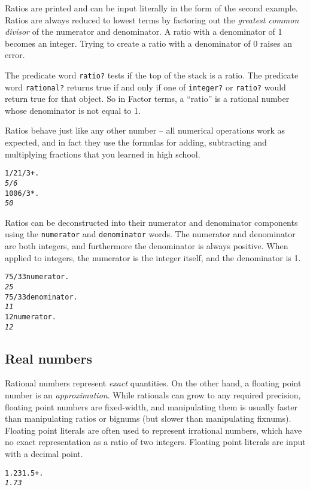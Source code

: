 \documentclass[english]{article}
\begin{document}
Ratios are printed and can be input literally in the form of the second example. Ratios are always reduced to lowest terms by factoring out the \emph{greatest common divisor} of the numerator and denominator. A ratio with a denominator of 1 becomes an integer. Trying to create a ratio with a denominator of 0 raises an error.

The predicate word \texttt{ratio?} tests if the top of the stack is a ratio. The predicate word \texttt{rational?} returns true if and only if one of \texttt{integer?} or \texttt{ratio?} would return true for that object. So in Factor terms, a ``ratio'' is a rational number whose denominator is not equal to 1.

Ratios behave just like any other number -- all numerical operations work as expected, and in fact they use the formulas for adding, subtracting and multiplying fractions that you learned in high school.

\begin{alltt}
1/2 1/3 + .
\emph{5/6}
100 6 / 3 * .
\emph{50}
\end{alltt}

Ratios can be deconstructed into their numerator and denominator components using the \texttt{numerator} and \texttt{denominator} words. The numerator and denominator are both integers, and furthermore the denominator is always positive. When applied to integers, the numerator is the integer itself, and the denominator is 1.

\begin{alltt}
75/33 numerator .
\emph{25}
75/33 denominator .
\emph{11}
12 numerator .
\emph{12}
\end{alltt}

\subsection{Real numbers}

Rational numbers represent \emph{exact} quantities. On the other hand, a floating point number is an \emph{approximation}. While rationals can grow to any required precision, floating point numbers are fixed-width, and manipulating them is usually faster than manipulating ratios or bignums (but slower than manipulating fixnums). Floating point literals are often used to represent irrational numbers, which have no exact representation as a ratio of two integers. Floating point literals are input with a decimal point.

\begin{alltt}
1.23 1.5 + .
\emph{1.73}
\end{alltt}
\end{document}
